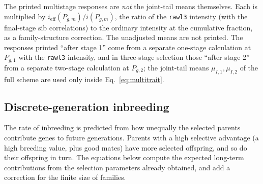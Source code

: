 \documentclass[11pt]{article}
\newcommand{\src}[1]{\texttt{#1}}
\begin{document}
\begin{codenote}
The printed multistage responses are \emph{not} the joint-tail means themselves. Each is multiplied by $i_{\mathrm{eff}}(P_{g,m})/i(P_{g,m})$, the ratio of the \src{rawl3} intensity (with the final-stage sib correlations) to the ordinary intensity at the cumulative fraction, as a family-structure correction. The unadjusted means are not printed. The responses printed ``after stage 1'' come from a separate one-stage calculation at $P_{g,1}$ with the \src{rawl3} intensity, and in three-stage selection those ``after stage 2'' from a separate two-stage calculation at $P_{g,2}$; the joint-tail means $\mu_{I,1},\mu_{I,2}$ of the full scheme are used only inside Eq.~\eqref{eq:multitrait}.
\end{codenote}

\subsection{Discrete-generation inbreeding}\label{sec:inbreeding}
\begin{inwords}
The rate of inbreeding is predicted from how unequally the selected parents contribute genes to future generations. Parents with a high selective advantage (a high breeding value, plus good mates) have more selected offspring, and so do their offspring in turn. The equations below compute the expected long-term contributions from the selection parameters already obtained, and add a correction for the finite size of families.
\end{inwords}
\end{document}
